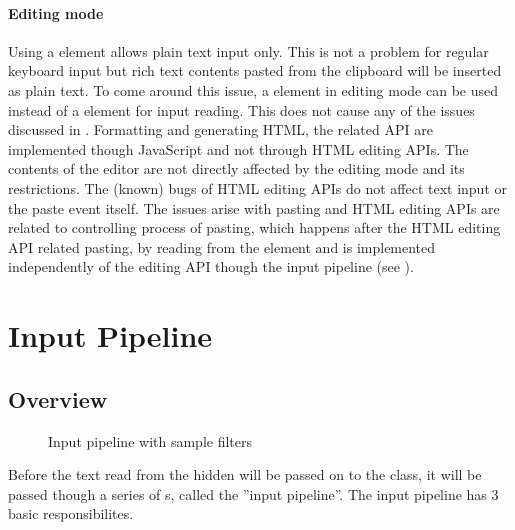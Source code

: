 \paragraph{Editing mode} Using a  element allows plain text input only. This is not a problem for regular keyboard input but rich text contents pasted from the clipboard will be inserted as plain text. To come around this issue, a  element in editing mode can be used instead of a  element for input reading. This does not cause any of the issues discussed in . Formatting and generating HTML, the related API are implemented though JavaScript and not through HTML editing APIs. The contents of the editor are not directly affected by the editing mode and its restrictions. The (known) bugs of HTML editing APIs do not affect text input or the paste event itself. The issues arise with pasting and HTML editing APIs are related to controlling process of pasting, which happens after the HTML editing API related pasting, by reading from the  element and is implemented independently of the editing API though the input pipeline (see ).

\section{Input Pipeline}
\label{sec:input_pipeline}

\subsection{Overview} 
\label{subsec:input_pipeline_overview}

\begin{figure}[!htb]
\centering
{}
\caption{Input pipeline with sample filters}
\label{fig:type_base_components}
\end{figure}

Before the text read from the hidden  will be passed on to the  class, it will be passed though a series of s, called the ''input pipeline''. The input pipeline has 3 basic responsibilites.

